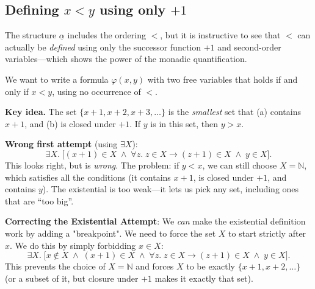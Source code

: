 \subsection{Defining \texorpdfstring{$x < y$}{x < y} using only \texorpdfstring{$+1$}{+1}}
\label{sec:s1s-ordering}

The structure $\underline{\alpha}$ includes the ordering $<$, but it is
instructive to see that $<$ can actually be \emph{defined} using only
the successor function $+1$ and second-order variables---which shows
the power of the monadic quantification.

\begin{example}
\label{ex:s1s-order}
We want to write a formula $\varphi(x, y)$ with two free variables that
holds if and only if $x < y$, using no occurrence of $<$.

\medskip\noindent
\textbf{Key idea.}  The set $\{x+1, x+2, x+3, \ldots\}$ is the
\emph{smallest} set that (a) contains $x+1$, and (b) is closed under
$+1$.  If $y$ is in this set, then $y > x$.

\medskip\noindent
\textbf{Wrong first attempt} (using $\exists X$):
\[
  \exists X.\;\bigl[(x+1) \in X \;\land\;
              \forall z.\; z \in X \to (z+1) \in X \;\land\;
              y \in X\bigr].
\]
This looks right, but is \emph{wrong}.  The problem: if $y < x$, we can
still choose $X = \mathbb{N}$, which satisfies all the conditions (it
contains $x+1$, is closed under $+1$, and contains $y$).  The existential
is too weak---it lets us pick any set, including ones that are ``too big''.

\textbf{Correcting the Existential Attempt}:
We \emph{can} make the existential definition work by adding a "breakpoint". We need to force the set $X$ to start strictly after $x$. We do this by simply forbidding $x \in X$:
\[
  \exists X.\;\bigl[x \notin X \;\land\; (x+1) \in X \;\land\;
              \forall z.\; z \in X \to (z+1) \in X \;\land\;
              y \in X\bigr].
\]
This prevents the choice of $X = \mathbb{N}$ and forces $X$ to be exactly $\{x+1, x+2, \ldots\}$ (or a subset of it, but closure under $+1$ makes it exactly that set).


\end{example}
